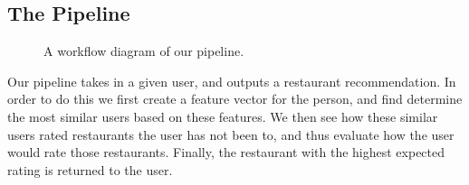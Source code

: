 \documentclass[10pt,twocolumn,letterpaper]{article}
\begin{document}
\subsection{The Pipeline}
\begin{figure}[t]
\begin{center}
\end{center}
   \caption{A workflow diagram of our pipeline.}
\label{fig:long}
\label{fig:onecol}
\end{figure}

Our pipeline takes in a given user, and outputs a restaurant recommendation. In order to do this we first create a feature vector for the person, and find determine the most similar users based on these features. We then see how these similar users rated restaurants the user has not been to, and thus evaluate how the user would rate those restaurants. Finally, the restaurant with the highest expected rating is returned to the user.
\end{document}
